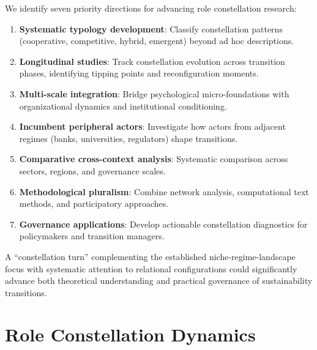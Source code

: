 \documentclass[
    fontsize=10pt,
    twoside=true,
    secnumdepth=2,
    numbers=noenddot
]{kaobook}
\begin{document}
We identify seven priority directions for advancing role constellation research:

\begin{enumerate}[noitemsep,topsep=0pt]
    \item \textbf{Systematic typology development}: Classify constellation patterns (cooperative, competitive, hybrid, emergent) beyond ad hoc descriptions.
    \item \textbf{Longitudinal studies}: Track constellation evolution across transition phases, identifying tipping points and reconfiguration moments.
    \item \textbf{Multi-scale integration}: Bridge psychological micro-foundations with organizational dynamics and institutional conditioning.
    \item \textbf{Incumbent peripheral actors}: Investigate how actors from adjacent regimes (banks, universities, regulators) shape transitions.
    \item \textbf{Comparative cross-context analysis}: Systematic comparison across sectors, regions, and governance scales.
    \item \textbf{Methodological pluralism}: Combine network analysis, computational text methods, and participatory approaches.
    \item \textbf{Governance applications}: Develop actionable constellation diagnostics for policymakers and transition managers.
\end{enumerate}

A ``constellation turn'' complementing the established niche-regime-landscape focus with systematic attention to relational configurations could significantly advance both theoretical understanding and practical governance of sustainability transitions.

\section{Role Constellation Dynamics}
\end{document}

